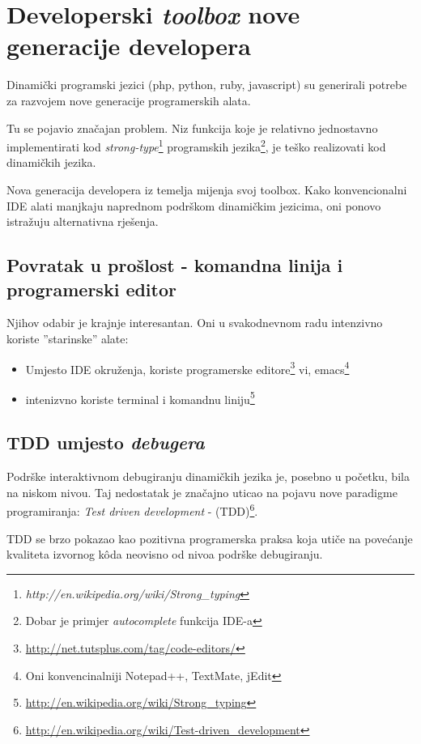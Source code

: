 \documentclass[times, utf8, seminar]{fit}
\begin{document}
\chapter{Developerski \emph{toolbox} nove generacije developera}

Dinamički programski jezici (php, python, ruby, javascript) su generirali potrebe za razvojem nove generacije programerskih alata. 

Tu se pojavio značajan problem. Niz funkcija koje je relativno jednostavno implementirati kod \emph{strong-type}\footnote{\emph{http://en.wikipedia.org/wiki/Strong_typing}} programskih jezika\footnote{Dobar je primjer \emph{autocomplete} funkcija IDE-a}, je teško realizovati kod dinamičkih jezika.


Nova generacija developera iz temelja mijenja svoj toolbox. Kako konvencionalni IDE alati manjkaju naprednom podrškom dinamičkim jezicima, oni ponovo istražuju alternativna rješenja.

\section{Povratak u prošlost - komandna linija i programerski editor}

Njihov odabir je krajnje interesantan. Oni u svakodnevnom radu intenzivno koriste ''starinske'' alate:
\begin{itemize}
  \item Umjesto IDE okruženja, koriste programerske editore\footnote{\url{http://net.tutsplus.com/tag/code-editors/}} vi, emacs\footnote{Oni konvencinalniji Notepad++, TextMate, jEdit}
  \item intenizvno koriste terminal i komandnu liniju\footnote{\url{http://en.wikipedia.org/wiki/Strong_typing}} 
\end{itemize}

\section{TDD umjesto \emph{debugera}}

Podrške interaktivnom debugiranju dinamičkih jezika je, posebno u početku, bila na niskom nivou. Taj nedostatak je značajno uticao na pojavu nove paradigme programiranja: \emph{Test driven development} - (TDD)\footnote{\url{http://en.wikipedia.org/wiki/Test-driven_development}}.

TDD se brzo pokazao kao pozitivna programerska praksa koja utiče na povećanje kvaliteta izvornog k\^oda neovisno od nivoa podrške debugiranju. 
\end{document}
